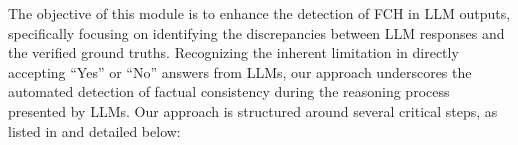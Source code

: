 The objective of this module is to enhance the detection of FCH in LLM outputs, specifically focusing on identifying the discrepancies between LLM responses and the verified ground truths. Recognizing the inherent limitation in directly accepting ``Yes'' or ``No'' answers from LLMs, our approach underscores the automated detection of factual consistency during the reasoning process presented by LLMs. 
Our approach is structured around several critical steps, as listed in  and detailed below:
